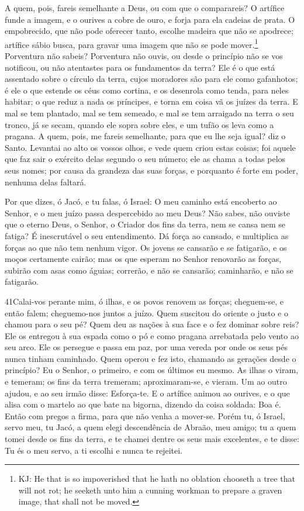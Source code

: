 A quem, pois, fareis semelhante a Deus, ou com que o comparareis?
O artífice funde a imagem, e o ourives a cobre de ouro, e
forja para ela cadeias de prata. O empobrecido, que não pode
oferecer tanto, escolhe madeira que não se apodrece; artífice sábio
busca, para gravar uma imagem que não se pode mover.\footnote{KJ: He
that is so impoverished that he hath no oblation chooseth a tree
that will not rot; he seeketh unto him a cunning workman to prepare
a graven image, that shall not be moved.} Porventura não
sabeis? Porventura não ouvis, ou desde o princípio não se vos
notificou, ou não atentastes para os fundamentos da terra?
Ele é o que está assentado sobre o círculo da terra, cujos
moradores são para ele como gafanhotos; é ele o que estende os céus
como cortina, e os desenrola como tenda, para neles habitar;
o que reduz a nada os príncipes, e torna em coisa vã os
juízes da terra. E mal se tem plantado, mal se tem semeado, e
mal se tem arraigado na terra o seu tronco, já se secam, quando ele
sopra sobre eles, e um tufão os leva como a pragana.
 A quem, pois, me fareis semelhante, para que eu lhe seja igual?
diz o Santo. Levantai ao alto os vossos olhos, e vede quem
criou estas coisas; foi aquele que faz sair o exército delas segundo
o seu número; ele as chama a todas pelos seus nomes; por causa da
grandeza das suas forças, e porquanto é forte em poder, nenhuma
delas faltará.

Por que dizes, ó Jacó, e tu falas, ó Israel: O meu caminho está
encoberto ao Senhor, e o meu juízo passa despercebido ao meu Deus?
Não sabes, não ouviste que o eterno Deus, o Senhor, o Criador
dos fins da terra, nem se cansa nem se fatiga? É inescrutável o seu
entendimento. Dá força ao cansado, e multiplica as forças ao
que não tem nenhum vigor. Os jovens se cansarão e se
fatigarão, e os moços certamente cairão; mas os que esperam
no Senhor renovarão as forças, subirão com asas como águias;
correrão, e não se cansarão; caminharão, e não se fatigarão.

\medskip

\lettrine{41}{}Calai-vos perante mim, ó ilhas, e os povos
renovem as forças; cheguem-se, e então falem; cheguemo-nos juntos a
juízo. Quem suscitou do oriente o justo e o chamou para o seu
pé? Quem deu as nações à sua face e o fez dominar sobre reis? Ele os
entregou à sua espada como o pó e como pragana arrebatada pelo vento
ao seu arco. Ele os persegue e passa em paz, por uma vereda por
onde os seus pés nunca tinham caminhado. Quem operou e fez isto,
chamando as gerações desde o princípio? Eu o Senhor, o primeiro, e
com os últimos eu mesmo. As ilhas o viram, e temeram; os fins da
terra tremeram; aproximaram-se, e vieram. Um ao outro ajudou, e
ao seu irmão disse: Esforça-te. E o artífice animou ao ourives,
e o que alisa com o martelo ao que bate na bigorna, dizendo da coisa
soldada: Boa é. Então com pregos a firma, para que não venha a
mover-se. Porém tu, ó Israel, servo meu, tu Jacó, a quem elegi
descendência de Abraão, meu amigo; tu a quem tomei desde os fins
da terra, e te chamei dentre os seus mais excelentes, e te disse: Tu
és o meu servo, a ti escolhi e nunca te rejeitei.

